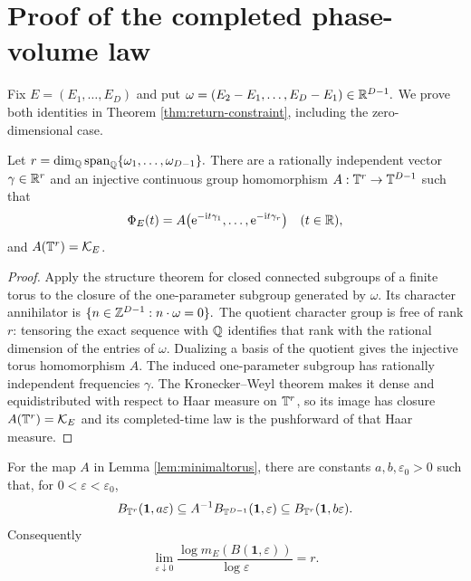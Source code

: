 \section{Proof of the completed phase-volume law}
\label{sec:proof-capstone}

Fix $E=(E_1,\ldots,E_D)$ and put
\(
 \omega=(E_2-E_1,\ldots,E_D-E_1)\in\mathbb R^{D-1}.
\)
We prove both identities in Theorem \ref{thm:return-constraint}, including the
zero-dimensional case.

\begin{lemma}
\label{lem:minimaltorus}
Let
\(
 r=\dim_{\mathbb Q}\operatorname{span}_{\mathbb Q}\{\omega_1,\ldots,
 \omega_{D-1}\}.
\)
There are a rationally independent vector $\gamma\in\mathbb R^r$ and an injective
continuous group homomorphism $A:\mathbb T^r\to\mathbb T^{D-1}$ such that
\begin{equation}
 \Phi_E(t)=A\bigl(\mathrm e^{-\mathrm i t\gamma_1},\ldots,
                  \mathrm e^{-\mathrm i t\gamma_r}\bigr)
 \quad(t\in\mathbb R),                                      \label{eq:minimaltorus}
\end{equation}
and $A(\mathbb T^r)=\mathcal K_E$.
\end{lemma}

\begin{proof}
Apply the structure theorem for closed connected subgroups of a finite torus
to the closure of the one-parameter subgroup generated by $\omega$.  Its
character annihilator is
\(
 \{n\in\mathbb Z^{D-1}:n\cdot\omega=0\}.
\)
The quotient character group is free of rank $r$: tensoring the exact
sequence with $\mathbb Q$ identifies that rank with the rational dimension of the
entries of $\omega$.  Dualizing a basis of the quotient gives the injective
torus homomorphism $A$.  The induced one-parameter subgroup has rationally
independent frequencies $\gamma$.  The Kronecker--Weyl theorem makes it dense
and equidistributed with respect to Haar measure on $\mathbb T^r$, so its image has
closure $A(\mathbb T^r)=\mathcal K_E$ and its completed-time law is the pushforward of
that Haar measure.
\end{proof}

\begin{lemma}
\label{lem:smalltargetvolume}
For the map $A$ in Lemma \ref{lem:minimaltorus}, there are constants
$a,b,\varepsilon_0>0$ such that, for $0<\varepsilon<\varepsilon_0$,
\begin{equation}
 B_{\mathbb T^r}(\mathbf1,a\varepsilon)
 \subseteq A^{-1}B_{\mathbb T^{D-1}}(\mathbf1,\varepsilon)
 \subseteq B_{\mathbb T^r}(\mathbf1,b\varepsilon).          \label{eq:ballsandwich}
\end{equation}
Consequently
\begin{equation}
 \lim_{\varepsilon\downarrow0}
 \frac{\log m_E(B(\mathbf1,\varepsilon))}
      {\log\varepsilon}=r.                           \label{eq:haarexponent}
\end{equation}
\end{lemma}

